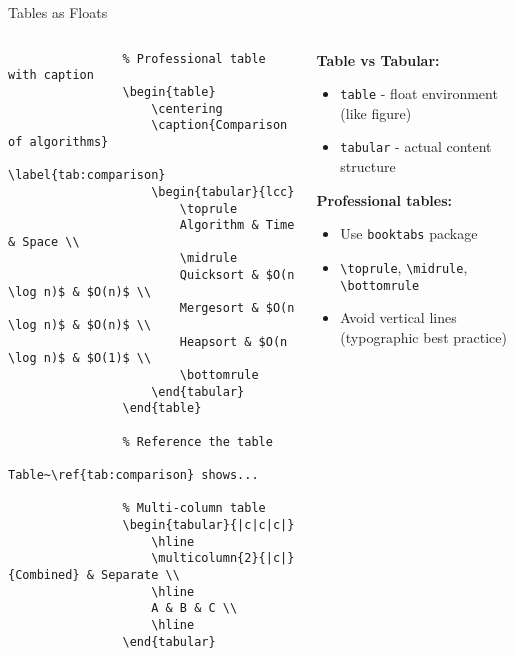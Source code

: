 \begin{frame}[fragile]{Tables as Floats}
	\begin{columns}
		\begin{column}{0.5\textwidth}
			\begin{lstlisting}
				% Professional table with caption
				\begin{table}
					\centering
					\caption{Comparison of algorithms}
					\label{tab:comparison}
					\begin{tabular}{lcc}
						\toprule
						Algorithm & Time & Space \\
						\midrule
						Quicksort & $O(n \log n)$ & $O(n)$ \\
						Mergesort & $O(n \log n)$ & $O(n)$ \\
						Heapsort & $O(n \log n)$ & $O(1)$ \\
						\bottomrule
					\end{tabular}
				\end{table}
				
				% Reference the table
				Table~\ref{tab:comparison} shows...
				
				% Multi-column table
				\begin{tabular}{|c|c|c|}
					\hline
					\multicolumn{2}{|c|}{Combined} & Separate \\
					\hline
					A & B & C \\
					\hline
				\end{tabular}
			\end{lstlisting}
		\end{column}
		
		\begin{column}{0.5\textwidth}
			\textbf{Table vs Tabular:}
			\begin{itemize}
				\item \texttt{table} - float environment (like figure)
				\item \texttt{tabular} - actual content structure
			\end{itemize}
			
			\textbf{Professional tables:}
			\begin{itemize}
				\item Use \texttt{booktabs} package
				\item \texttt{\textbackslash toprule}, \texttt{\textbackslash midrule}, \texttt{\textbackslash bottomrule}
				\item Avoid vertical lines (typographic best practice)
			\end{itemize}
			

\end{column}
\end{columns}
\end{frame}
